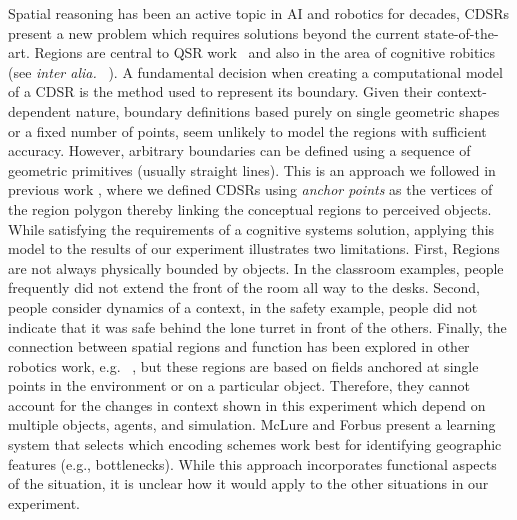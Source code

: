 \documentclass[11pt,letterpaper]{article}
\begin{document}
Spatial reasoning has been an active topic in AI and robotics for decades, CDSRs present a new problem which requires solutions beyond the current state-of-the-art. Regions are central to QSR work~\cite{Cohn:2001} and also in the area of cognitive robitics (see \emph{inter alia.} ~\cite{brenneretal07ijcai,kelleher/costello:09}). A fundamental decision when creating a computational model of a CDSR is the method used to represent its boundary. Given their context-dependent nature, boundary definitions based purely on single geometric shapes or a fixed number of points, seem unlikely to model the regions with sufficient accuracy. However, arbitrary boundaries can be defined using a sequence of geometric primitives (usually straight lines). This is an approach we followed in previous work \cite{Hawes:2012}, where we defined CDSRs using \textit{anchor points} as the vertices of the region polygon thereby linking the conceptual regions to perceived objects.  While satisfying the requirements of a cognitive systems solution, applying this model to the results of our experiment illustrates two limitations.  First, Regions are not always physically bounded by objects.  In the classroom examples, people frequently did not extend the front of the room all way to the desks.  Second, people consider dynamics of a context, in the safety example, people did not indicate that it was safe behind the lone turret in front of the others. Finally, the connection between spatial regions and function has been explored in other robotics work, e.g. ~\cite{Karg:2012,Fasola:2013}, but these regions are based on fields anchored at single points in the environment or on a particular object. Therefore, they cannot account for the changes in context shown in this experiment which depend on multiple objects, agents, and simulation.  McLure and Forbus \cite{McLureForbus:2012} present a learning system that selects which encoding schemes work best for identifying geographic features (e.g., bottlenecks).  While this approach incorporates functional aspects of the situation, it is unclear how it would apply to the other situations in our experiment.  




\end{document}
